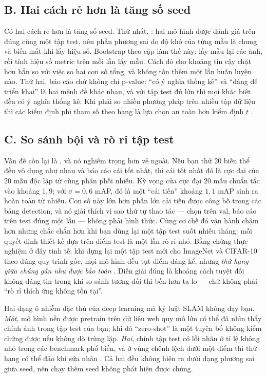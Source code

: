\documentclass[../../deep_learning.tex]{subfiles}
\begin{document}
\subsection{B. Hai cách rẻ hơn là tăng số seed}
Có hai cách rẻ hơn là tăng số seed. Thứ nhất, : hai mô hình được đánh giá trên đúng cùng một tập test, nên phần phương sai do độ khó của từng mẫu là chung và biến mất khi lấy hiệu số. Bootstrap theo cặp làm thế này: lấy mẫu lại các ảnh, rồi tính hiệu số metric trên mỗi lần lấy mẫu. Cách đó cho khoảng tin cậy chặt hơn hẳn so với việc so hai con số tổng, và không tốn thêm một lần huấn luyện nào. Thứ hai, báo cáo  chứ không chỉ p-value: ``có ý nghĩa thống kê'' và ``đáng để triển khai'' là hai mệnh đề khác nhau, và với tập test đủ lớn thì mọi khác biệt đều có ý nghĩa thống kê. Khi phải so nhiều phương pháp trên nhiều tập dữ liệu thì các kiểm định phi tham số theo hạng là lựa chọn an toàn hơn kiểm định \(t\) \cite{demsar2006statistical}.

\subsection{C. So sánh bội và rò rỉ tập test}
Vấn đề còn lại là , và nó nghiêm trọng hơn vẻ ngoài. Nếu bạn thử 20 biến thể đều vô dụng như nhau và báo cáo cái tốt nhất, thì cái tốt nhất đó là cực đại của 20 mẫu độc lập từ cùng phân phối nhiễu. Kỳ vọng của cực đại 20 mẫu chuẩn tắc vào khoảng \(1{,}9\); với \(\sigma = 0{,}6\) mAP, đó là một ``cải tiến'' khoảng \(1{,}1\) mAP sinh ra hoàn toàn từ nhiễu. Con số này lớn hơn phần lớn cải tiến được công bố trong các bảng detection, và nó giải thích vì sao thứ tự thao tác — chọn trên val, báo cáo trên test đúng một lần — không phải hình thức. Cùng cơ chế đó vận hành chậm hơn nhưng chắc chắn hơn khi bạn dùng lại một tập test suốt nhiều tháng: mỗi quyết định thiết kế dựa trên điểm test là một lần rò rỉ nhỏ. Bằng chứng thực nghiệm ở đây tinh tế: khi dựng lại một tập test mới cho ImageNet và CIFAR-10 theo đúng quy trình gốc, mọi mô hình đều tụt điểm đáng kể, nhưng \emph{thứ hạng giữa chúng gần như được bảo toàn} \cite{recht2019imagenet}. Diễn giải đúng là khoảng cách tuyệt đối không đáng tin trong khi so sánh tương đối thì bền hơn ta lo — chứ không phải ``rò rỉ thích ứng không tồn tại''.

\begin{cambay}
Hai dạng ô nhiễm đặc thù của deep learning mà kỷ luật SLAM không dạy bạn. \emph{Một}, mô hình nền được pretrain trên dữ liệu web quy mô lớn có thể đã nhìn thấy chính ảnh trong tập test của bạn; khi đó ``zero-shot'' là một tuyên bố không kiểm chứng được nếu không dò trùng lặp. \emph{Hai}, chính tập test có lỗi nhãn ở tỉ lệ không nhỏ trong các benchmark phổ biến, và ở vùng chênh lệch dưới một điểm thì thứ hạng có thể đảo khi sửa nhãn \cite{northcutt2021pervasive}. Cả hai đều không hiện ra dưới dạng phương sai giữa seed, nên chạy thêm seed không phát hiện được chúng.
\end{cambay}
\end{document}
